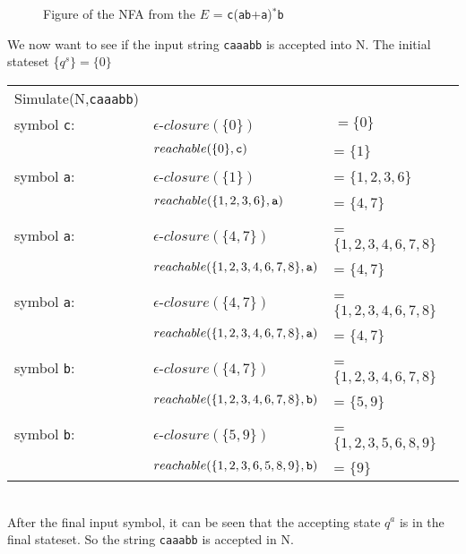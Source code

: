 \begin{myex}
\begin{figure}[h!]
\begin{center}
  \end{center}
  \caption{Figure of the NFA from the $E$ = {\tt c}({\tt ab}+{\tt a})$^*${\tt b}}
  \label{nfasimsucc}
\end{figure}
We now want to see if the input string {\tt caaabb} is accepted into N. The initial stateset \{$q^s\}=\{0\}$ \\
\begin{tabular}{l l l}
Simulate(N,{\tt caaabb}) & & \\
symbol {\tt c}: & $\epsilon$-$closure(\{0\})$ &$ = \{0\}$\\
&$reachable(\{0\},{\tt c})$& = $\{1\}$\\
symbol {\tt a}: & $\epsilon$-$closure(\{1\})$& = $\{1,2,3,6\}$\\
&$reachable(\{1,2,3,6\},{\tt a})$ & = $\{4,7\}$\\
symbol {\tt a}: & $\epsilon$-$closure(\{4,7\})$& = $\{1,2,3,4,6,7,8\}$\\
&$reachable(\{1,2,3,4,6,7,8\},{\tt a})$ &= $\{4,7\}$\\
symbol {\tt a}: & $\epsilon$-$closure(\{4,7\})$& = $\{1,2,3,4,6,7,8\}$\\
&$reachable(\{1,2,3,4,6,7,8\},{\tt a})$ &= $\{4,7\}$\\
symbol {\tt b}: & $\epsilon$-$closure(\{4,7\})$& = $\{1,2,3,4,6,7,8\}$\\
&$reachable(\{1,2,3,4,6,7,8\},{\tt b})$ &= $\{5,9\}$\\
symbol {\tt b}: & $\epsilon$-$closure(\{5,9\})$& = $\{1,2,3,5,6,8,9\}$\\
&$reachable(\{1,2,3,6,5,8,9\},{\tt b})$ &= $\{9\}$\\
\end{tabular}\\
After the final input symbol, it can be seen that the accepting state $q^a$ is in the final stateset. So the string {\tt caaabb} is accepted in N.
\end{myex}
\newpage
